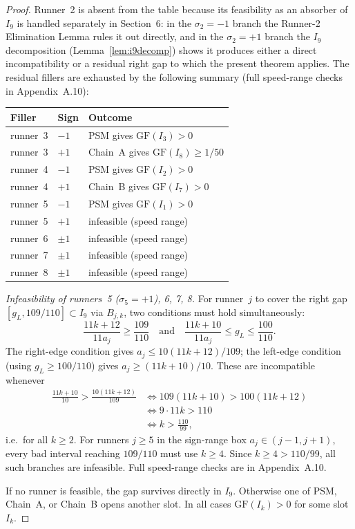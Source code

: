 \documentclass[12pt,a4paper]{amsart}
\theoremstyle{definition}
\theoremstyle{remark}
\newcommand{\GF}{\mathrm{GF}}
\begin{document}
\begin{proof}
Runner~2 is absent from the table because its feasibility as an absorber of $I_9$ is
handled separately in Section~6: in the $\sigma_2=-1$ branch the Runner-2 Elimination
Lemma rules it out directly, and in the $\sigma_2=+1$ branch the $I_9$ decomposition
(Lemma~\ref{lem:i9decomp}) shows it produces either a direct incompatibility or a
residual right gap to which the present theorem applies. The residual fillers are exhausted by the following summary
(full speed-range checks in Appendix~A.10):

\medskip
\begin{center}
\begin{tabular}{lll}
\toprule
Filler & Sign & Outcome \\
\midrule
runner~3 & $-1$ & PSM gives $\GF(I_3)>0$ \\
runner~3 & $+1$ & Chain~A gives $\GF(I_8)\ge 1/50$ \\
runner~4 & $-1$ & PSM gives $\GF(I_2)>0$ \\
runner~4 & $+1$ & Chain~B gives $\GF(I_7)>0$ \\
runner~5 & $-1$ & PSM gives $\GF(I_1)>0$ \\
runner~5 & $+1$ & infeasible (speed range) \\
runner~6 & $\pm1$ & infeasible (speed range) \\
runner~7 & $\pm1$ & infeasible (speed range) \\
runner~8 & $\pm1$ & infeasible (speed range) \\
\bottomrule
\end{tabular}
\end{center}

\medskip
\textit{Infeasibility of runners~5 ($\sigma_5=+1$), 6, 7, 8.} For runner~$j$ to cover
the right gap $[g_L,109/110]\subset I_9$ via $B_{j,k}$, two conditions must hold
simultaneously:
\[
  \frac{11k+12}{11a_j}\ge\frac{109}{110}\quad\text{and}\quad
  \frac{11k+10}{11a_j}\le g_L \le \frac{100}{110}.
\]
The right-edge condition gives $a_j\le 10(11k+12)/109$; the left-edge condition (using
$g_L\ge 100/110$) gives $a_j\ge(11k+10)/10$. These are incompatible whenever
\begin{align*}
  \frac{11k+10}{10} > \frac{10(11k+12)}{109}
  &\iff 109(11k+10)>100(11k+12) \\
  &\iff 9\cdot 11k > 110 \\
  &\iff k > \frac{110}{99},
\end{align*}
i.e.\ for all $k\ge 2$. For runners $j\ge 5$ in the sign-range box
$a_j\in(j-1,j+1)$, every bad interval reaching $109/110$ must use $k\ge 4$.
Since $k\ge 4>110/99$, all such branches are infeasible. Full speed-range checks are in Appendix~A.10.

If no runner is feasible, the gap survives directly in $I_9$. Otherwise one of PSM,
Chain~A, or Chain~B opens another slot. In all cases $\GF(I_k)>0$ for some slot $I_k$.
\end{proof}
\end{document}
